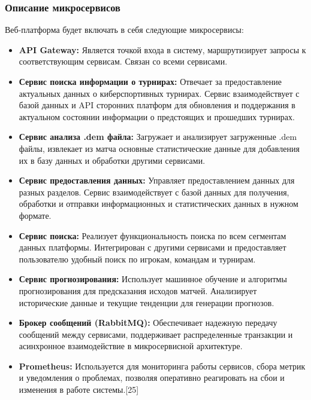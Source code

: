 \subsubsection{Описание микросервисов}

Веб-платформа будет включать в себя следующие микросервисы:

\begin{itemize}
	\item \textbf{API Gateway:} Является точкой входа в систему, маршрутизирует запросы к соответствующим сервисам. Связан со всеми сервисами.
	\item \textbf{Сервис поиска информации о турнирах:} Отвечает за предоставление актуальных данных о киберспортивных турнирах. Сервис взаимодействует с базой данных и API сторонних платформ для обновления и поддержания в актуальном состоянии информации о предстоящих и прошедших турнирах.
	\item \textbf{Сервис анализа .dem файла:} Загружает и анализирует загруженные .dem файлы, извлекает из матча основные статистические данные для добавления их в базу данных и обработки другими сервисами.
	\item \textbf{Сервис предоставления данных:} Управляет предоставлением данных для разных разделов. Сервис взаимодействует с базой данных для получения, обработки и отправки информационных и статистических данных в нужном формате.
	\item \textbf{Сервис поиска:} Реализует функциональность поиска по всем сегментам данных платформы. Интегрирован с другими сервисами и предоставляет пользователю удобный поиск по игрокам, командам и турнирам.
	\item \textbf{Сервис прогнозирования:} Использует машинное обучение и алгоритмы прогнозирования для предсказания исходов матчей. Анализирует исторические данные и текущие тенденции для генерации прогнозов.
	\item \textbf{Брокер сообщений (RabbitMQ):} Обеспечивает надежную передачу сообщений между сервисами, поддерживает распределенные транзакции и асинхронное взаимодействие в микросервисной архитектуре.
	\item \textbf{Prometheus:} Используется для мониторинга работы сервисов, сбора метрик и уведомления о проблемах, позволяя оперативно реагировать на сбои и изменения в работе системы.[25]
\end{itemize}

